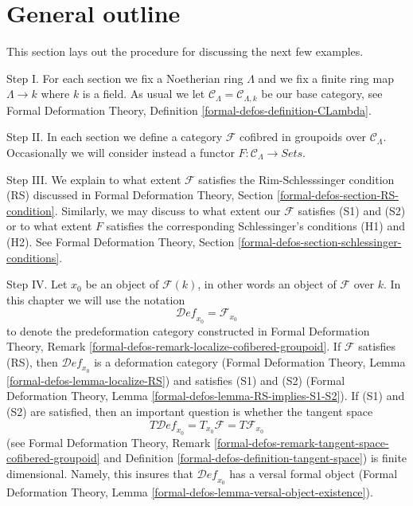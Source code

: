 \documentclass{stacks-project}
\theoremstyle{plain}
\theoremstyle{definition}
\theoremstyle{remark}
\numberwithin{equation}{subsection}
\def\Deformationcategory{\mathcal{D}\!\mathit{ef}}
\begin{document}
\section{General outline}
\label{section-general}

\noindent
This section lays out the procedure for discussing the next few examples.

\medskip\noindent
Step I. For each section we fix a Noetherian ring $\Lambda$ and
we fix a finite ring map $\Lambda \to k$ where $k$ is a field.
As usual we let $\mathcal{C}_\Lambda = \mathcal{C}_{\Lambda, k}$
be our base category, see
Formal Deformation Theory,
Definition \ref{formal-defos-definition-CLambda}.

\medskip\noindent
Step II. In each section we define a category $\mathcal{F}$
cofibred in groupoids over $\mathcal{C}_\Lambda$. Occasionally
we will consider instead a functor
$F : \mathcal{C}_\Lambda \to \textit{Sets}$.

\medskip\noindent
Step III. We explain to what extent $\mathcal{F}$ satisfies
the Rim-Schlesssinger condition (RS) discussed in
Formal Deformation Theory, Section \ref{formal-defos-section-RS-condition}.
Similarly, we may discuss to what extent our $\mathcal{F}$
satisfies (S1) and (S2) or to what extent $F$ satisfies
the corresponding Schlessinger's conditions (H1) and (H2).
See Formal Deformation Theory, Section
\ref{formal-defos-section-schlessinger-conditions}.

\medskip\noindent
Step IV. Let $x_0$ be an object of $\mathcal{F}(k)$, in other words an object
of $\mathcal{F}$ over $k$. In this chapter we will use the notation
$$
\Deformationcategory_{x_0} = \mathcal{F}_{x_0}
$$
to denote the predeformation category constructed in
Formal Deformation Theory, Remark
\ref{formal-defos-remark-localize-cofibered-groupoid}.
If $\mathcal{F}$ satisfies (RS), then
$\Deformationcategory_{x_0}$ is a deformation category
(Formal Deformation Theory, Lemma
\ref{formal-defos-lemma-localize-RS})
and satisfies (S1) and (S2)
(Formal Deformation Theory, Lemma
\ref{formal-defos-lemma-RS-implies-S1-S2}).
If (S1) and (S2) are satisfied, then
an important question is whether the tangent space
$$
T\Deformationcategory_{x_0} = T_{x_0}\mathcal{F} = T\mathcal{F}_{x_0}
$$
(see Formal Deformation Theory, Remark
\ref{formal-defos-remark-tangent-space-cofibered-groupoid} and
Definition \ref{formal-defos-definition-tangent-space})
is finite dimensional. Namely, this insures that
$\Deformationcategory_{x_0}$ has a versal formal object
(Formal Deformation Theory, Lemma
\ref{formal-defos-lemma-versal-object-existence}).
\end{document}
